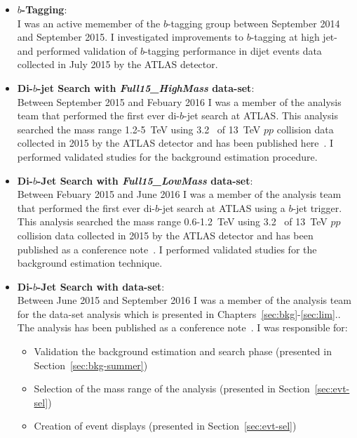 \begin{itemize}[leftmargin=*]
\item\textbf{$b$-Tagging}:\\
  I was an active memember of the $b$-tagging group between September 2014 and September 2015.
  I investigated improvements to $b$-tagging at high jet-\pT{} and
  performed validation of $b$-tagging performance in dijet events data collected in July 2015 by the ATLAS detector. \vspace{1em}
\item\textbf{Di-$b$-jet Search with \textit{Full15\_HighMass} data-set}:\\
  Between September 2015 and Febuary 2016 I was a member of the analysis team that performed the first ever di-$b$-jet search at ATLAS.
  This analysis searched the mass range 1.2-5~TeV using 3.2~\ifb{} of 13~TeV $pp$ collision data collected in 2015 by the ATLAS detector
  and has been published here~\cite{dibjet-mori16_paper}. 
  I performed validated studies for the background estimation procedure. \vspace{1em}
\item\textbf{Di-$b$-Jet Search  with \textit{Full15\_LowMass} data-set}:\\
  Between Febuary 2015 and June 2016 I was a member of the analysis team that performed the first ever di-$b$-jet search at ATLAS using a $b$-jet trigger.
  This analysis searched the mass range 0.6-1.2~TeV using 3.2~\ifb{} of 13~TeV $pp$ collision data collected in 2015 by the ATLAS detector
  and has been published as a conference note~\cite{dibjet-lhcp_conf}.
  I performed validated studies for the background estimation technique. \vspace{1em}
    \newpage
\item\textbf{Di-$b$-Jet Search  with \summer{} data-set}:\\ 
  Between June 2015 and September 2016 I was a member of the analysis team for the \summer{} data-set analysis
  which is presented in Chapters~\ref{sec:bkg}-\ref{sec:lim}..
  The analysis has been published as a conference note~\cite{dibjet-ichep_conf}. 
  I was responsible for:
  \begin{itemize}
    \item Validation the background estimation and search phase (presented in Section~\ref{sec:bkg-summer})
    \item Selection of the mass range of the analysis (presented in Section~\ref{sec:evt-sel})
    \item Creation of event displays (presented in Section~\ref{sec:evt-sel})

\end{itemize}
\end{itemize}
